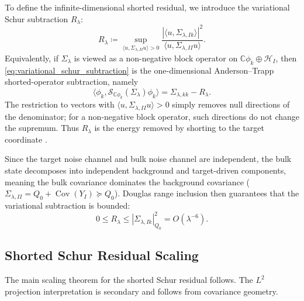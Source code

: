 \documentclass[preprint,12pt]{elsarticle}
\theoremstyle{plain}
\theoremstyle{definition}
\theoremstyle{remark}
\begin{document}
    To define the infinite-dimensional shorted residual, we introduce the variational Schur subtraction $R_\lambda$:
    \begin{equation}
        \label{eq:variational_schur_subtraction}
        R_\lambda \coloneqq \sup_{\langle u, \Sigma_{\lambda,II} u \rangle > 0} \frac{|\langle u, \Sigma_{\lambda,Ik} \rangle|^2}{\langle u, \Sigma_{\lambda,II} u \rangle}.
    \end{equation}
    Equivalently, if $\Sigma_\lambda$ is viewed as a non-negative block operator on $\mathbb{C}\phi_k\oplus\mathcal{H}_I$, then \eqref{eq:variational_schur_subtraction} is the one-dimensional Anderson--Trapp shorted-operator subtraction, namely
    \begin{equation}
        \label{eq:shorted_operator_scalar}
        \big\langle \phi_k,\mathcal{S}_{\mathbb{C}\phi_k}(\Sigma_\lambda)\phi_k\big\rangle
        =\Sigma_{\lambda,kk}-R_\lambda.
    \end{equation}
    The restriction to vectors with $\langle u,\Sigma_{\lambda,II}u\rangle>0$ simply removes null directions of the denominator; for a non-negative block operator, such directions do not change the supremum. Thus $R_\lambda$ is the energy removed by shorting to the target coordinate \cite{anderson1975shorted,owhadi2015conditioning,contino2021matrix,naikjohnson2024complementable}.

    Since the target noise channel and bulk noise channel are independent, the bulk state decomposes into independent background and target-driven components, meaning the bulk covariance dominates the background covariance ($\Sigma_{\lambda,II} = Q_0 + \operatorname{Cov}(Y_I) \succeq Q_0$). Douglas range inclusion then guarantees that the variational subtraction is bounded:
    \begin{equation}
        0 \le R_\lambda \le |\Sigma_{\lambda,Ik}|_{Q_0}^2 = O(\lambda^{-6}).
    \end{equation}

    \subsection{Shorted Schur Residual Scaling}
    \label{sec:infdim:scaling}

    The main scaling theorem for the shorted Schur residual follows. The $L^2$ projection interpretation is secondary and follows from covariance geometry.
\end{document}
